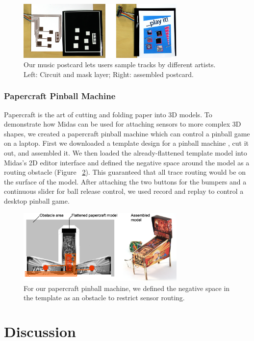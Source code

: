 \begin{figure}[t]
\centering
\includegraphics[width=3.25in]{figures/midas/poster3.jpg}
\caption{Our music postcard lets users sample tracks by different artists. Left: Circuit and mask layer; Right: assembled postcard.} 
\label{fig:midas-poster}
\end{figure}

        \subsubsection{Papercraft Pinball Machine}
Papercraft is the art of cutting and folding paper into 3D models. To demonstrate how Midas can be used for attaching sensors to more complex 3D shapes, 
we created a papercraft pinball machine which can control a pinball game on a laptop. First we downloaded a template design for a pinball machine \cite{indianajones}, cut it out, and assembled it.  We then loaded the already-flattened template model into Midas's 2D editor interface and defined the negative space around the model as a routing obstacle (Figure ~\ref{fig:midas-pinball}). This guaranteed that all trace routing would be on the surface of the model. After attaching the two buttons for the bumpers and a continuous slider for ball release control, we used record and replay to control a desktop pinball game.

\begin{figure}
\centering
\includegraphics[width=3.25in]{figures/midas/pinball-horizontal.png}
\caption{For our papercraft pinball machine, we defined the negative space in the template as an obstacle to restrict sensor routing.} 
\label{fig:midas-pinball}
\end{figure}


\section{Discussion}

